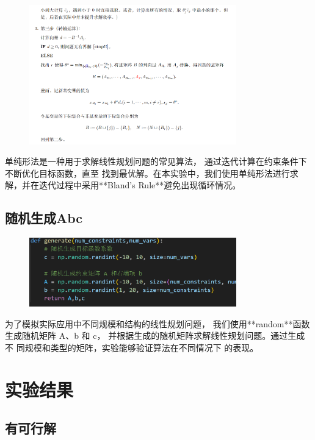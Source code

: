 \documentclass[10pt,a4paper,oneside]{article}
\begin{document}
\begin{figure}[H]
    \centering
    \includegraphics[width=0.8\textwidth]{屏幕截图 2024-11-05 112033.png}
\end{figure}

单纯形法是一种用于求解线性规划问题的常见算法，
通过迭代计算在约束条件下不断优化目标函数，直至
找到最优解。在本实验中，我们使用单纯形法进行求
解，并在迭代过程中采用**Bland’s Rule**避免出现循环情况。

\subsection{随机生成Abc}

\begin{figure}[H]
    \centering
    \includegraphics[width=0.8\textwidth]{屏幕截图 2024-11-05 110734.png}
\end{figure}

为了模拟实际应用中不同规模和结构的线性规划问题，
我们使用**random**函数生成随机矩阵 A、b 和 c，
并根据生成的随机矩阵求解线性规划问题。通过生成不
同规模和类型的矩阵，实验能够验证算法在不同情况下
的表现。

\section{实验结果}

\subsection{有可行解}
\end{document}
